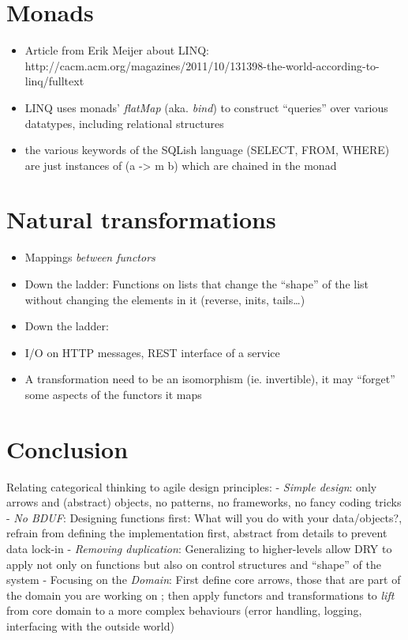 \documentclass{article}
\begin{document}
\section{Monads}

\begin{itemize}
\item
  Article from Erik Meijer about LINQ:
  http://cacm.acm.org/magazines/2011/10/131398-the-world-according-to-linq/fulltext
\item
  LINQ uses monads' \emph{flatMap} (aka. \emph{bind}) to construct
  ``queries'' over various datatypes, including relational structures
\item
  the various keywords of the SQLish language (SELECT, FROM, WHERE) are
  just instances of (a -\textgreater{} m b) which are chained in the
  monad
\end{itemize}
\section{Natural transformations}

\begin{itemize}
\item
  Mappings \emph{between functors}
\item
  Down the ladder: Functions on lists that change the ``shape'' of the
  list without changing the elements in it (reverse, inits,
  tails\ldots{})
\item
  Down the ladder:
\item
  I/O on HTTP messages, REST interface of a service
\item
  A transformation need to be an isomorphism (ie. invertible), it may
  ``forget'' some aspects of the functors it maps
\end{itemize}
\section{Conclusion}

Relating categorical thinking to agile design principles: - \emph{Simple
design}: only arrows and (abstract) objects, no patterns, no frameworks,
no fancy coding tricks - \emph{No BDUF}: Designing functions first: What
will you do with your data/objects?, refrain from defining the
implementation first, abstract from details to prevent data lock-in -
\emph{Removing duplication}: Generalizing to higher-levels allow DRY to
apply not only on functions but also on control structures and ``shape''
of the system - Focusing on the \emph{Domain}: First define core arrows,
those that are part of the domain you are working on ; then apply
functors and transformations to \emph{lift} from core domain to a more
complex behaviours (error handling, logging, interfacing with the
outside world)
\end{document}
